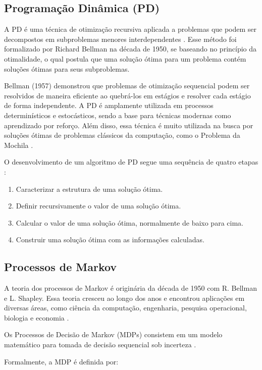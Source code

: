 \subsection{Programação Dinâmica (PD)}

A PD é uma técnica de otimização recursiva aplicada a problemas que podem ser decompostos em subproblemas menores interdependentes \cite{Hillier2001}. Esse método foi formalizado por Richard Bellman na década de 1950, se baseando no princípio da otimalidade, o qual postula que uma solução ótima para um problema contém soluções ótimas para seus subproblemas.

Bellman (1957) demonstrou que problemas de otimização sequencial podem ser resolvidos de maneira eficiente ao quebrá-los em estágios e resolver cada estágio de forma independente. A PD é amplamente utilizada em processos determinísticos e estocásticos, sendo a base para técnicas modernas como aprendizado por reforço. Além disso, essa técnica é muito utilizada na busca por soluções ótimas de problemas clássicos da computação, como o Problema da Mochila \cite{Kleinberg2006}.

O desenvolvimento de um algoritmo de PD segue uma sequência de quatro etapas \cite{Cormen2009}:
\begin{enumerate}
    \item Caracterizar a estrutura de uma solução ótima.
    \item Definir recursivamente o valor de uma solução ótima.
    \item Calcular o valor de uma solução ótima, normalmente de baixo para cima.
    \item Construir uma solução ótima com as informações calculadas.
\end{enumerate}

\subsection{Processos de Markov}

A teoria dos processos de Markov é originária da década de 1950 com R. Bellman e L. Shapley. Essa teoria cresceu ao longo dos anos e encontrou aplicações em diversas áreas, como ciência da computação, engenharia, pesquisa operacional, biologia e economia \cite{Bauerle2010}.

Os Processos de Decisão de Markov (MDPs) consistem em um modelo matemático para tomada de decisão sequencial sob incerteza \cite{Bauerle2010}.

Formalmente, a MDP é definida por:

